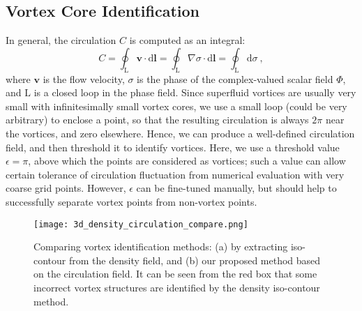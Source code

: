 \documentclass[10pt,journal,compsoc,twoside]{IEEEtran}
\begin{document}
	
	

	\subsection{Vortex Core Identification}
	In general, the circulation $C$ is computed as an integral:
	\begin{equation} \label{circ_def}  %
		C=\oint_\mathrm{L} \mathbf{v} \cdot \mathrm{d} \mathbf{l} 
		= \oint_\mathrm{L} \nabla \sigma \cdot \mathrm{d} \mathbf{l}
		= \oint_\mathrm{L} \mathrm{d} \sigma \ ,
	\end{equation}
	where $\textbf{v}$ is the flow velocity, $\sigma$ is the phase of the complex-valued scalar field $\Phi$, and $\mathrm{L}$ is a closed loop in the phase field.
	Since superfluid vortices are usually very small with infinitesimally small vortex cores, we use a small loop (could be very arbitrary) to enclose a point, so that the resulting circulation is always $2\pi$ near the vortices, and zero elsewhere.
	Hence, we can produce a well-defined circulation field, and then threshold it to identify vortices.
	Here, we use a threshold value $\epsilon=\pi$, above which the points are considered as vortices; such a value can allow certain tolerance of circulation fluctuation from numerical evaluation with very coarse grid points.
	However, $\epsilon$ can be fine-tuned manually, but should help to successfully separate vortex points from non-vortex points.
	
	\begin{figure}[!t]
		\centering
		\texttt{[image: 3d\_density\_circulation\_compare.png]}
		\caption{Comparing vortex identification methods: (a) by extracting iso-contour from the density field, and (b) our proposed method based on the circulation field.
			It can be seen from the red box that some incorrect vortex structures are identified by the density iso-contour method.}
		\label{fig:3d_density_circulation_compare}
	\end{figure}
	
\end{document}
